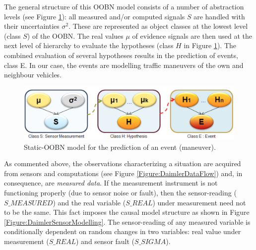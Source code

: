 

The general structure of this OOBN model consists of a number of abstraction levels (see Figure \ref{Figure:DaimlerOOBNAbstraction}): all measured and/or computed signals $S$ are handled with their uncertainties $\sigma^2$. These are represented as object classes at the lowest level (class $S$) of the OOBN. The real values $\mu$ of evidence signals are then used at the next level of hierarchy to evaluate the hypotheses (class $H$ in Figure \ref{Figure:DaimlerOOBNAbstraction}). The combined evaluation of several hypotheses results in the prediction of events, class E. In our case, the events are modelling traffic maneuvers of the own and neighbour vehicles.

\begin{figure}
\begin{center}
\includegraphics[scale=0.35]{./figures/DaimlerOOBNAbstraction}
\caption{\label{Figure:DaimlerOOBNAbstraction} Static-OOBN model for the prediction of an event (maneuver).}
\end{center}
\end{figure}

As commented above, the observations characterizing a situation are acquired from sensors and computations (see Figure \ref{Figure:DaimlerDataFlow}) and, in consequence, are \textit{measured data}. If the measurement instrument is not functioning properly (due to sensor noise or fault), then the sensor-reading ($S\_MEASURED$) and the real variable ($S\_REAL$) under measurement need not to be the same. This fact imposes the causal model structure as shown in Figure \ref{Figure:DaimlerSensorModelling}. The sensor-reading of any measured variable is conditionally dependent on random changes in two variables: real value under measurement ($S\_REAL$) and sensor fault ($S\_SIGMA$).

